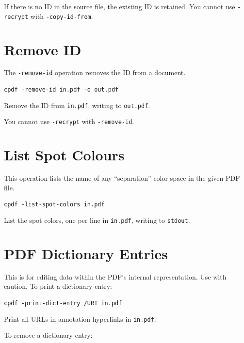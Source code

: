 \documentclass{book}
\begin{document}
  \noindent If there is no ID in the source file, the existing ID is retained. You cannot use \texttt{-recrypt} with \texttt{-copy-id-from}.

\section{Remove ID}
  The \texttt{-remove-id} operation removes the ID from a document.

  \begin{framed}
  \small\noindent\verb!cpdf -remove-id in.pdf -o out.pdf!

  \vspace{2.5mm}
  \noindent Remove the ID from \texttt{in.pdf}, writing to \texttt{out.pdf}.
  \end{framed}

\noindent You cannot use \texttt{-recrypt} with \texttt{-remove-id}.

\section{List Spot Colours}
This operation lists the name of any ``separation'' color space in the given PDF file.

  \begin{framed}
  \small\noindent\verb!cpdf -list-spot-colors in.pdf!

  \vspace{2.5mm}
  \noindent List the spot colors, one per line in \texttt{in.pdf}, writing to \texttt{stdout}.
  \end{framed}

\section{PDF Dictionary Entries}
\label{removedictentry}
This is for editing data within the PDF's internal representation. Use with caution.
To print a dictionary entry:

  \begin{framed}
  \small\noindent\verb!cpdf -print-dict-entry /URI in.pdf!

  \vspace{2.5mm}
  \noindent Print all URLs in annotation hyperlinks in \texttt{in.pdf}. 
  \end{framed}

\noindent To remove a dictionary entry:
\end{document}
